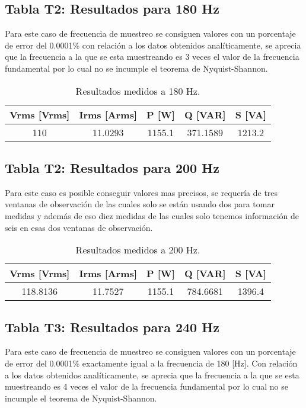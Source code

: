 
\subsection*{Tabla T2: Resultados para 180 Hz}
Para este caso de frecuencia de muestreo se consiguen valores con un porcentaje de error del 0.0001\% con relación a los datos obtenidos analíticamente, se aprecia que la frecuencia a la que se esta muestreando es 3 veces el valor de la frecuencia fundamental por lo cual no se incumple el teorema de Nyquist-Shannon.
\begin{table}[h!]
    \centering
    \begin{tabular}{@{}ccccc@{}}
        \toprule
        Vrms [Vrms] & Irms [Arms] & P [W] & Q [VAR] & S [VA] \\ \midrule
            110 & 11.0293 & 1155.1 & 371.1589 & 1213.2\\ 
            \bottomrule
    \end{tabular}
    \caption{Resultados medidos a 180 Hz.}
\end{table}



\subsection*{Tabla T2: Resultados para 200 Hz}
Para este caso es posible conseguir valores mas precisos, se requería de tres ventanas de observación de las cuales solo se están usando dos para tomar medidas y además de eso diez medidas de las cuales solo tenemos información de seis en esas dos ventanas de observación.
\begin{table}[h!]
    \centering
    \begin{tabular}{@{}ccccc@{}}
        \toprule
        Vrms [Vrms] & Irms [Arms] & P [W] & Q [VAR] & S [VA] \\ \midrule
        118.8136 & 11.7527 & 1155.1 & 784.6681 & 1396.4 \\ 
        \bottomrule
    \end{tabular}
    \caption{Resultados medidos a 200 Hz.}
\end{table}

\subsection*{Tabla T3: Resultados para 240 Hz}
Para este caso de frecuencia de muestreo se consiguen valores con un porcentaje de error del 0.0001\% exactamente igual a la frecuencia de 180 [Hz]. Con relación a los datos obtenidos analíticamente, se aprecia que la frecuencia a la que se esta muestreando es 4 veces el valor de la frecuencia fundamental por lo cual no se incumple el teorema de Nyquist-Shannon. 

